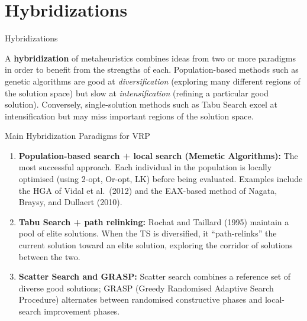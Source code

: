 \documentclass[aspectratio=169,10pt]{beamer}
\begin{document}
\section{Hybridizations}

\begin{frame}[allowframebreaks]{Hybridizations}

  A \textbf{hybridization} of metaheuristics combines ideas from
  two or more paradigms in order to benefit from the strengths of each.
  Population-based methods such as genetic algorithms are good at
  \emph{diversification} (exploring many different regions of the
  solution space) but slow at \emph{intensification} (refining a
  particular good solution).  Conversely, single-solution methods such
  as Tabu Search excel at intensification but may miss important regions
  of the solution space.

  \begin{block}{Main Hybridization Paradigms for VRP}
    \begin{enumerate}
      \item \textbf{Population-based search + local search (Memetic
            Algorithms):} The most successful approach.  Each individual
            in the population is locally optimised (using 2-opt, Or-opt,
            LK) before being evaluated.  Examples include the HGA of
            Vidal et al.\ (2012) and the EAX-based method of Nagata,
            Braysy, and Dullaert (2010).
      \item \textbf{Tabu Search + path relinking:} Rochat and Taillard
            (1995) maintain a pool of elite solutions.  When the TS is
            diversified, it ``path-relinks'' the current solution toward
            an elite solution, exploring the corridor of solutions between
            the two.
      \item \textbf{Scatter Search and GRASP:} Scatter search combines a
            reference set of diverse good solutions; GRASP (Greedy
            Randomised Adaptive Search Procedure) alternates between
            randomised constructive phases and local-search improvement
            phases.
    \end{enumerate}
  \end{block}

  \framebreak


\end{frame}
\end{document}
